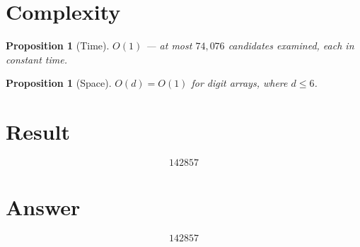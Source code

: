\documentclass[12pt]{article}
\newtheorem{proposition}[theorem]{Proposition}
\theoremstyle{definition}
\begin{document}
\section{Complexity}

\begin{proposition}[Time]
$O(1)$ --- at most $74{,}076$ candidates examined, each in constant time.
\end{proposition}

\begin{proposition}[Space]
$O(d) = O(1)$ for digit arrays, where $d \leq 6$.
\end{proposition}

\section{Result}
\[
\boxed{142857}
\]

\section{Answer}

\[
\boxed{142857}
\]
\end{document}
